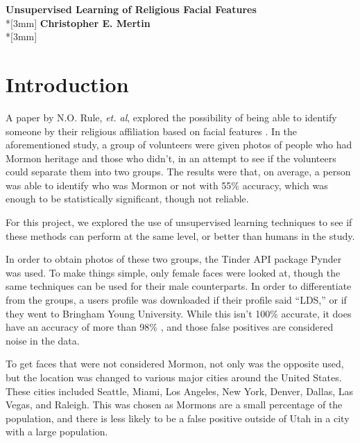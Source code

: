 \documentclass{article}
\begin{document}
\pagestyle{empty}
\begin{center}
{\Large{\bf Unsupervised Learning of Religious Facial Features}}\\*[3mm]
{\bf Christopher E. Mertin} \\*[3mm]
\end{center}


\section*{Introduction}

A paper by N.O. Rule, {\em et. al}, explored the possibility of being able to identify someone by their religious affiliation based on facial features \cite{MormonID}. In the aforementioned study, a group of volunteers were given photos of people who had Mormon heritage and those who didn't, in an attempt to see if the volunteers could separate them into two groups. The results were that, on average, a person was able to identify who was Mormon or not with 55\% accuracy, which was enough to be statistically significant, though not reliable.

For this project, we explored the use of unsupervised learning techniques to see if these methods can perform at the same level, or better than humans in the study.

In order to obtain photos of these two groups, the Tinder API package Pynder \cite{pynder} was used. To make things simple, only female faces were looked at, though the same techniques can be used for their male counterparts. In order to differentiate from the groups, a users profile was downloaded if their profile said ``LDS,'' or if they went to Bringham Young University. While this isn't 100\% accurate, it does have an accuracy of more than 98\% \cite{byu}, and those false positives are considered noise in the data.

To get faces that were not considered Mormon, not only was the opposite used, but the location was changed to various major cities around the United States. These cities included Seattle, Miami, Los Angeles, New York, Denver, Dallas, Las Vegas, and Raleigh. This was chosen as Mormons are a small percentage of the population, and there is less likely to be a false positive outside of Utah in a city with a large population.
\end{document}
